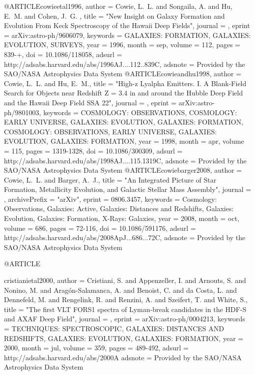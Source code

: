{{{{{{{{{{{{{{@ARTICLE{cowieetal1996,
   author = {{Cowie}, L.~L. and {Songaila}, A. and {Hu}, E.~M. and {Cohen}, J.~G.
	},
    title = "{New Insight on Galaxy Formation and Evolution From Keck Spectroscopy of the Hawaii Deep Fields}",
  journal = {\aj},
   eprint = {arXiv:astro-ph/9606079},
 keywords = {GALAXIES: FORMATION, GALAXIES: EVOLUTION, SURVEYS},
     year = 1996,
    month = sep,
   volume = 112,
    pages = {839-+},
      doi = {10.1086/118058},
   adsurl = {http://adsabs.harvard.edu/abs/1996AJ....112..839C},
  adsnote = {Provided by the SAO/NASA Astrophysics Data System}
}
@ARTICLE{cowieandhu1998,
   author = {{Cowie}, L.~L. and {Hu}, E.~M.},
    title = "{High-z Lyalpha Emitters. I. A Blank-Field Search for Objects near Redshift Z = 3.4 in and around the Hubble Deep Field and the Hawaii Deep Field SSA 22}",
  journal = {\aj},
   eprint = {arXiv:astro-ph/9801003},
 keywords = {COSMOLOGY: OBSERVATIONS, COSMOLOGY: EARLY UNIVERSE, GALAXIES: EVOLUTION, GALAXIES: FORMATION, COSMOLOGY: OBSERVATIONS, EARLY UNIVERSE, GALAXIES: EVOLUTION, GALAXIES: FORMATION},
     year = 1998,
    month = apr,
   volume = 115,
    pages = {1319-1328},
      doi = {10.1086/300309},
   adsurl = {http://adsabs.harvard.edu/abs/1998AJ....115.1319C},
  adsnote = {Provided by the SAO/NASA Astrophysics Data System}
}
@ARTICLE{cowiebarger2008,
   author = {{Cowie}, L.~L. and {Barger}, A.~J.},
    title = "{An Integrated Picture of Star Formation, Metallicity Evolution, and Galactic Stellar Mass Assembly}",
  journal = {\apj},
archivePrefix = "arXiv",
   eprint = {0806.3457},
 keywords = {Cosmology: Observations, Galaxies: Active, Galaxies: Distances and Redshifts, Galaxies: Evolution, Galaxies: Formation, X-Rays: Galaxies},
     year = 2008,
    month = oct,
   volume = 686,
    pages = {72-116},
      doi = {10.1086/591176},
   adsurl = {http://adsabs.harvard.edu/abs/2008ApJ...686...72C},
  adsnote = {Provided by the SAO/NASA Astrophysics Data System}
}


@ARTICLE{cristianietal2000,
   author = {{Cristiani}, S. and {Appenzeller}, I. and {Arnouts}, S. and 
	{Nonino}, M. and {Arag{\'o}n-Salamanca}, A. and {Benoist}, C. and 
	{da Costa}, L. and {Dennefeld}, M. and {Rengelink}, R. and {Renzini}, A. and 
	{Szeifert}, T. and {White}, S.},
    title = "{The first VLT FORS1 spectra of Lyman-break candidates in the HDF-S and AXAF Deep Field}",
  journal = {\aap},
   eprint = {arXiv:astro-ph/0004213},
 keywords = {TECHNIQUES: SPECTROSCOPIC, GALAXIES: DISTANCES AND REDSHIFTS, GALAXIES: EVOLUTION, GALAXIES: FORMATION},
     year = 2000,
    month = jul,
   volume = 359,
    pages = {489-492},
   adsurl = {http://adsabs.harvard.edu/abs/2000A%
  adsnote = {Provided by the SAO/NASA Astrophysics Data System}
}




}}}}}}}}}}}}}}}
